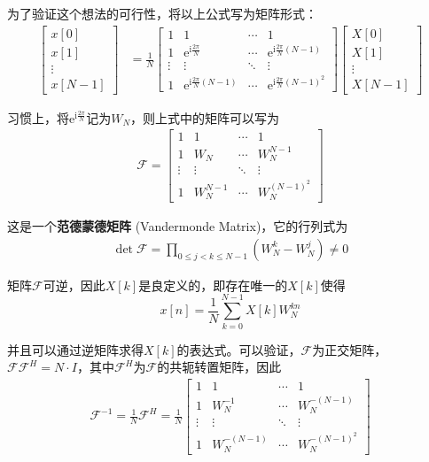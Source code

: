 \documentclass{ctexbook}
\begin{document}
为了验证这个想法的可行性，将以上公式写为矩阵形式：
\begin{align*}
\begin{bmatrix}x[0]  \\
x[1]  \\
\vdots \\
x[N-1]
\end{bmatrix}&=\frac{1}{N}\begin{bmatrix}1 & 1 & \cdots & 1 \\
1 & \mathrm{e}^{\mathrm{i}\frac{2\pi}{N}} & \cdots & \mathrm{e}^{\mathrm{i}\frac{2\pi}{N}(N-1)} \\
\vdots & \vdots & \ddots & \vdots \\
1 & \mathrm{e}^{\mathrm{i}\frac{2\pi}{N}(N-1)} & \cdots & \mathrm{e}^{\mathrm{i}\frac{2\pi}{N}(N-1)^2}
\end{bmatrix}\begin{bmatrix}X[0]  \\
X[1]  \\
\vdots \\
X[N-1]
\end{bmatrix}
\end{align*}

习惯上，将$\mathrm{e}^{\mathrm{i}\frac{2\pi}{N}}$记为$W_N$，则上式中的矩阵可以写为
\begin{align*}
    \mathcal{F} =\begin{bmatrix}1 & 1 & \cdots & 1 \\
        1 & W_N & \cdots & W_N^{N-1} \\
        \vdots & \vdots & \ddots & \vdots \\
        1 & W_N^{N-1} & \cdots & W_N^{(N-1)^2}
    \end{bmatrix}
\end{align*}

这是一个\textbf{范德蒙德矩阵} (Vandermonde Matrix)，它的行列式为
\begin{align*}
    \det\mathcal{F}=\prod_{0\leq j<k\leq N-1}(W_N^k-W_N^j)\neq 0
\end{align*}

矩阵$\mathcal{F}$可逆，因此$X[k]$是良定义的，即存在唯一的$X[k]$使得
\[x[n]=\frac{1}{N}\sum_{k=0}^{N-1}X[k]W_N^{kn}\]

并且可以通过逆矩阵求得$X[k]$的表达式。可以验证，$\mathcal{F} $为正交矩阵，$\mathcal{F} \mathcal{F} ^H=N\cdot I$，其中$\mathcal{F} ^H$为$\mathcal{F} $的共轭转置矩阵，因此
\begin{align*}
    \mathcal{F} ^{-1}=\frac{1}{N}\mathcal{F} ^H=\frac{1}{N}\begin{bmatrix}1 & 1 & \cdots & 1 \\
    1 & W_N^{-1} & \cdots & W_N^{-(N-1)} \\
    \vdots & \vdots & \ddots & \vdots \\
    1 & W_N^{-(N-1)} & \cdots & W_N^{-(N-1)^2}
    \end{bmatrix}
\end{align*}
\end{document}
